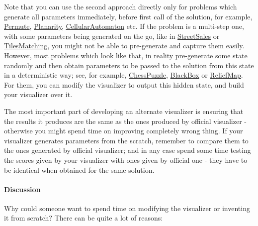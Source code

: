 Note that you can use the second approach directly only for problems
which generate all parameters immediately, before first call of the
solution, for example,
\href{http://www.topcoder.com/longcontest/?module=ViewProblemStatement\&rd=10932\&pm=8426}{Permute},
\href{http://www.topcoder.com/longcontest/?module=ViewProblemStatement\&rd=14272\&pm=10942}{Planarity},
\href{http://www.topcoder.com/longcontest/?module=ViewProblemStatement\&rd=14273\&pm=10989}{CellularAutomaton}
etc. If the problem is a multi-step one, with some parameters being
generated on the go, like in
\href{http://www.topcoder.com/longcontest/?module=ViewProblemStatement\&rd=14354\&pm=10034}{StreetSales}
or
\href{http://www.topcoder.com/longcontest/?module=ViewProblemStatement\&rd=13795\&pm=10410}{TilesMatching},
you might not be able to pre-generate and capture them easily. However,
most problems which look like that, in reality pre-generate some state
randomly and then obtain parameters to be passed to the solution from
this state in a deterministic way; see, for example,
\href{http://www.topcoder.com/longcontest/?module=ViewProblemStatement\&rd=14196\&pm=10728}{ChessPuzzle},
\href{http://www.topcoder.com/longcontest/?module=ViewProblemStatement\&rd=14208\&pm=10807}{BlackBox}
or
\href{http://www.topcoder.com/longcontest/?module=ViewProblemStatement\&rd=13766\&pm=10322}{ReliefMap}.
For them, you can modify the visualizer to output this hidden state, and
build your visualizer over it.

The most important part of developing an alternate visualizer is
ensuring that the results it produces are the same as the ones produced
by official visualizer - otherwise you might spend time on improving
completely wrong thing. If your visualizer generates parameters from the
scratch, remember to compare them to the ones generated by official
visualizer; and in any case spend some time testing the scores given by
your visualizer with ones given by official one - they have to be
identical when obtained for the same solution.

\hypertarget{discussion-1}{%
\paragraph{Discussion}\label{discussion-1}}

Why could someone want to spend time on modifying the visualizer or
inventing it from scratch? There can be quite a lot of reasons:

